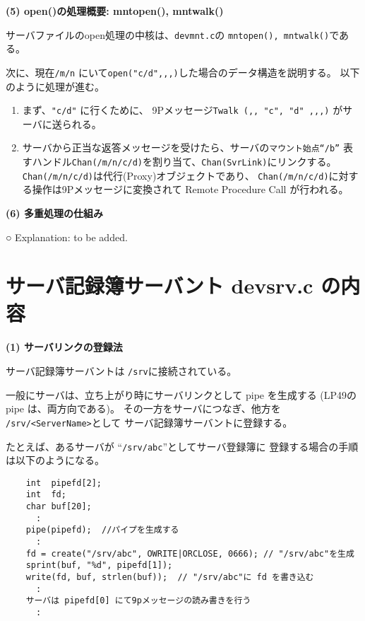 {\bf\flushleft (5) open()の処理概要: mntopen(), mntwalk()}

  サーバファイルのopen処理の中核は、{\tt devmnt.c}の 
{\tt mntopen(), mntwalk()}である。

次に、現在{\tt /m/n} にいて{\tt open("c/d",,,)}した場合のデータ構造を説明する。
以下のように処理が進む。

\begin{enumerate}
\item  
   まず、{\tt "c/d"} に行くために、
    9Pメッセージ{\tt Twalk (,, {"c", "d"} ,,,)} がサーバに送られる。

\item
   サーバから正当な返答メッセージを受けたら、サーバの{\tt マウント始点``/b''}
   表すハンドル{\tt Chan(/m/n/c/d)}を割り当て、{\tt Chan(SvrLink)}にリンクする。
   {\tt Chan(/m/n/c/d)}は代行(Proxy)オブジェクトであり、
   {\tt Chan(/m/n/c/d)}に対する操作は9Pメッセージに変換されて
   Remote Procedure Call が行われる。
   
\end{enumerate}



{\bf\flushleft (6) 多重処理の仕組み}


○  Explanation: to be added.


\vspace{5cm}





\section{サーバ記録簿サーバント devsrv.c の内容}

{\bf\flushleft (1) サーバリンクの登録法}

サーバ記録簿サーバントは {\tt /srv}に接続されている。

一般にサーバは、立ち上がり時にサーバリンクとして pipe を生成する
(LP49の pipe は、両方向である)。
その一方をサーバにつなぎ、他方を \verb|/srv/<ServerName>|として
サーバ記録簿サーバントに登録する。


たとえば、あるサーバが ``{\tt /srv/abc}''としてサーバ登録簿に
登録する場合の手順は以下のようになる。

{\small
\begin{verbatim}
    int  pipefd[2];
    int  fd;
    char buf[20]; 
      :
    pipe(pipefd);  //パイプを生成する
      :
    fd = create("/srv/abc", OWRITE|ORCLOSE, 0666); // "/srv/abc"を生成
    sprint(buf, "%d", pipefd[1]);  
    write(fd, buf, strlen(buf));  // "/srv/abc"に fd を書き込む
      :
    サーバは pipefd[0] にて9pメッセージの読み書きを行う
      :
\end{verbatim}
}

